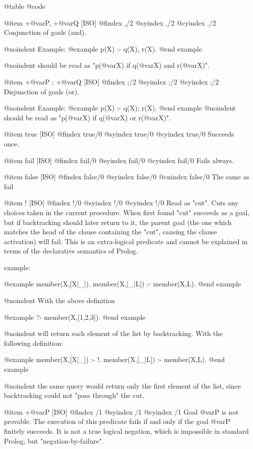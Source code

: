 {{{{@table @code

@item +@var{P}, +@var{Q} [ISO]
@findex ,/2
@syindex ,/2
@cyindex ,/2
Conjunction of goals (and).

@noindent
Example:
@example
 p(X) :- q(X), r(X).
@end example

@noindent
should be read as "p(@var{X}) if q(@var{X}) and r(@var{X})".

@item +@var{P} ; +@var{Q} [ISO]
@findex ;/2 
@syindex ;/2 
@cyindex ;/2 
Disjunction of goals (or).

@noindent
Example:
@example
 p(X) :- q(X); r(X).
@end example
@noindent
should be read as "p(@var{X}) if q(@var{X}) or r(@var{X})".

@item true [ISO]
@findex true/0
@syindex true/0
@cyindex true/0
Succeeds once.

@item fail [ISO]
@findex fail/0
@syindex fail/0
@cyindex fail/0
Fails always.

@item false [ISO]
@findex false/0
@syindex false/0
@cnindex false/0
The same as fail

@item ! [ISO]
@findex !/0
@syindex !/0
@cyindex !/0
  Read as "cut". Cuts any choices taken in the current procedure.
When first found "cut" succeeds as a goal, but if backtracking should
later return to it, the parent goal (the one which matches the head of
the clause containing the "cut", causing the clause activation) will
fail. This is an extra-logical predicate and cannot be explained in
terms of the declarative semantics of Prolog.

example:

@example
 member(X,[X|_]).
 member(X,[_|L]) :- member(X,L).
@end example

@noindent
With the above definition

@example
 ?- member(X,[1,2,3]).
@end example

@noindent
will return each element of the list by backtracking. With the following
definition:

@example
 member(X,[X|_]) :- !.
 member(X,[_|L]) :- member(X,L).
@end example

@noindent
the same query would return only the first element of the 
list, since backtracking could not "pass through" the cut.

@item \+ +@var{P} [ISO]
@findex \+/1
@syindex \+/1
@cyindex \+/1
Goal @var{P} is not provable. The execution of this predicate fails if
and only if the goal @var{P} finitely succeeds. It is not a true logical
negation, which is impossible in standard Prolog, but
"negation-by-failure".

}}}}
